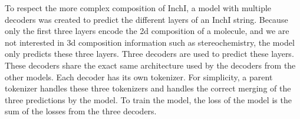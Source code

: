 To respect the more complex composition of InchI, a model with multiple decoders was created to predict the different layers of an InchI string.
Because only the first three layers encode the 2d composition of a molecule, and we are not interested in 3d composition information such as stereochemistry,
the model only predicts these three layers.
Three decoders are used to predict these layers. These decoders share the exact same architecture used by the decoders from the other models.
Each decoder has its own tokenizer. For simplicity, a parent tokenizer handles these three tokenizers and handles the correct merging of the three predictions by the model.
To train the model, the loss of the model is the sum of the losses from the three decoders.
